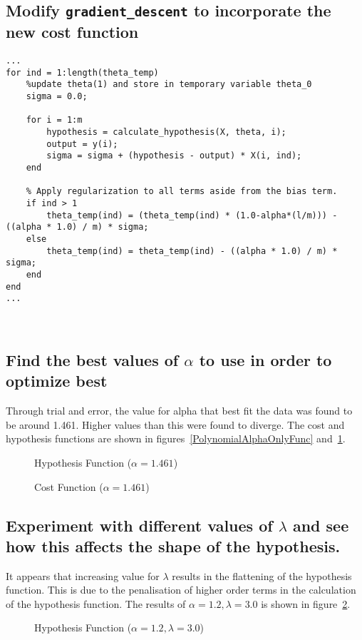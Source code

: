 \documentclass[titlepage]{scrartcl}
\newcommand{\code}[1]{\texttt{#1}}
\begin{document}
\subsection{Modify \code{gradient\_descent} to incorporate the new cost function}

\begin{lstlisting}[firstnumber=23]
...
for ind = 1:length(theta_temp)
    %update theta(1) and store in temporary variable theta_0
    sigma = 0.0;

    for i = 1:m
        hypothesis = calculate_hypothesis(X, theta, i);
        output = y(i);
        sigma = sigma + (hypothesis - output) * X(i, ind);
    end

    % Apply regularization to all terms aside from the bias term.
    if ind > 1
        theta_temp(ind) = (theta_temp(ind) * (1.0-alpha*(l/m))) - ((alpha * 1.0) / m) * sigma;
    else
        theta_temp(ind) = theta_temp(ind) - ((alpha * 1.0) / m) * sigma;
    end
end
...
\end{lstlisting}\leavevmode \\


\subsection{Find the best values of $\alpha$ to use in order to optimize best}
Through trial and error, the value for alpha that best fit the data was found
to be around 1.461. Higher values than this were found to diverge. The cost and
hypothesis functions are shown in figures~\ref{PolynomialAlphaOnlyFunc}
and~\ref{PolynomialAlphaOnlyCost}.

\begin{figure}
    \caption{Hypothesis Function ($\alpha=1.461$)}
    \label{PolynomialAlphaOnlyFunc}
    \caption{Cost Function ($\alpha=1.461$)}
    \label{PolynomialAlphaOnlyCost}
\end{figure}

\subsection{Experiment with different values of $\lambda$ and see how this affects the
    shape of the hypothesis.}
It appears that increasing value for $\lambda$ results in the flattening of the
hypothesis function. This is due to the penalisation of higher order terms in
the calculation of the hypothesis function. The results of $\alpha=1.2,
\lambda=3.0$ is shown in figure~\ref{PolynomialAlphaLambdaFunc}.

\begin{figure}
    \caption{Hypothesis Function ($\alpha=1.2, \lambda=3.0$)}
    \label{PolynomialAlphaLambdaFunc}
\end{figure}

\end{document}
